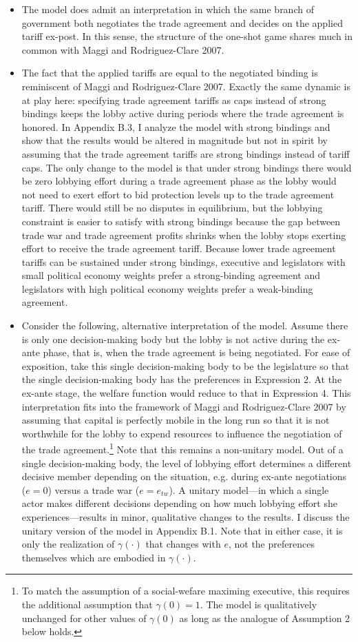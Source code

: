 \documentclass[12pt]{article}
\newcommand{\ga}{\gamma}
\begin{document}
\begin{itemize}
\begin{itemize}
				\item The model does admit an interpretation in which the same branch of government both negotiates the trade agreement and decides on the applied tariff ex-post. In this sense, the structure of the one-shot game shares much in common with Maggi and Rodriguez-Clare 2007.
				\item The fact that the applied tariffs are equal to the negotiated binding is reminiscent of Maggi and Rodriguez-Clare 2007. Exactly the same dynamic is at play here: specifying trade agreement tariffs as caps instead of strong bindings keeps the lobby active during periods where the trade agreement is honored. In Appendix B.3, I analyze the model with strong bindings and show that the results would be altered in magnitude but not in spirit by assuming that the trade agreement tariffs are strong bindings instead of tariff caps. The only change to the model is that under strong bindings there would be zero lobbying effort during a trade agreement phase as the lobby would not need to exert effort to bid protection levels up to the trade agreement tariff. There would still be no disputes in equilibrium, but the lobbying constraint is easier to satisfy with strong bindings because the gap between trade war and trade agreement profits shrinks when the lobby stops exerting effort to receive the trade agreement tariff. Because lower trade agreement tariffs can be sustained under strong bindings, executive and legislators with small political economy weights prefer a strong-binding agreement and legislators with high political economy weights prefer a weak-binding agreement.
				\item Consider the following, alternative interpretation of the model. Assume there is only one decision-making body but the lobby is not active during the ex-ante phase, that is, when the trade agreement is being negotiated. For ease of exposition, take this single decision-making body to be the legislature so that the single decision-making body has the preferences in Expression 2. At the ex-ante stage, the welfare function would reduce to that in Expression 4. This interpretation fits into the framework of Maggi and Rodriguez-Clare 2007 by assuming that capital is perfectly mobile in the long run so that it is not worthwhile for the lobby to expend resources to influence the negotiation of the trade agreement.\footnote{To match the assumption of a social-wefare maximing executive, this requires the additional assumption that $\ga(0)=1.$ The model is qualitatively unchanged for other values of $\ga(0)$ as long as the analogue of Assumption 2 below holds.} Note that this remains a non-unitary model. Out of a single decision-making body, the level of lobbying effort determines a different decisive member depending on the situation, e.g. during ex-ante negotiations ($e=0$) versus a trade war ($e=e_{tw}$). A unitary model---in which a single actor makes different decisions depending on how much lobbying effort she experiences---results in minor, qualitative changes to the results. I discuss the unitary version of the model in Appendix B.1. Note that in either case, it is only the realization of $\ga(\cdot)$ that changes with $e$, not the preferences themselves which are embodied in $\ga(\cdot)$.

\end{itemize}
\end{itemize}
\end{document}
